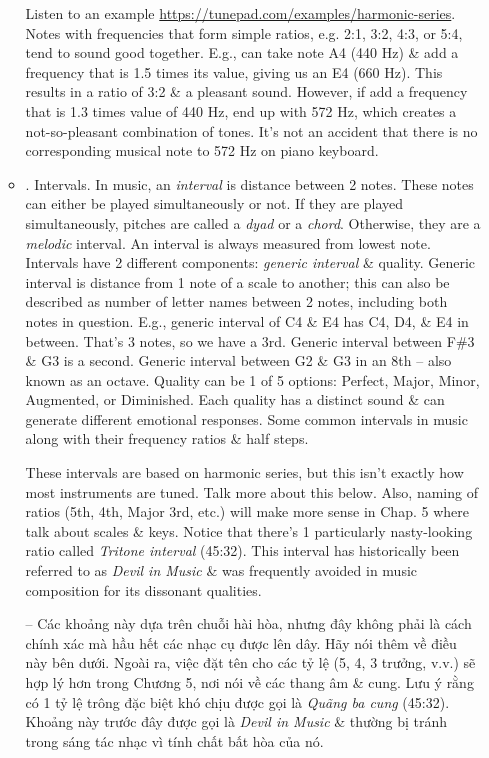 \documentclass{article}
\begin{document}
\begin{itemize}
\begin{itemize}
		Listen to an example \url{https://tunepad.com/examples/harmonic-series}. Notes with frequencies that form simple ratios, e.g. 2:1, 3:2, 4:3, or 5:4, tend to sound good together. E.g., can take note A4 (440 Hz) \& add a frequency that is 1.5 times its value, giving us an E4 (660 Hz). This results in a ratio of 3:2 \& a pleasant sound. However, if add a frequency that is 1.3 times value of 440 Hz, end up with 572 Hz, which creates a not-so-pleasant combination of tones. It's not an accident that there is no corresponding musical note to 572 Hz on piano keyboard.
		\item {. Intervals.} In music, an {\it interval} is distance between 2 notes. These notes can either be played simultaneously or not. If they are played simultaneously, pitches are called a {\it dyad} or a {\it chord}. Otherwise, they are a {\it melodic} interval. An interval is always measured from lowest note. Intervals have 2 different components: {\it generic interval} \& quality. Generic interval is distance from 1 note of a scale to another; this can also be described as number of letter names between 2 notes, including both notes in question. E.g., generic interval of C4 \& E4 has C4, D4, \& E4 in between. That's 3 notes, so we have a 3rd. Generic interval between F\#3 \& G3 is a second. Generic interval between G2 \& G3 in an 8th -- also known as an octave. Quality can be 1 of 5 options: Perfect, Major, Minor, Augmented, or Diminished. Each quality has a distinct sound \& can generate different emotional responses. Some common intervals in music along with their frequency ratios \& half steps. {\sf[Table]}
		
		These intervals are based on harmonic series, but this isn't exactly how most instruments are tuned. Talk more about this below. Also, naming of ratios (5th, 4th, Major 3rd, etc.) will make more sense in Chap. 5 where talk about scales \& keys. Notice that there's 1 particularly nasty-looking ratio called {\it Tritone interval} (45:32). This interval has historically been referred to as {\it Devil in Music} \& was frequently avoided in music composition for its dissonant qualities.
		
		-- Các khoảng này dựa trên chuỗi hài hòa, nhưng đây không phải là cách chính xác mà hầu hết các nhạc cụ được lên dây. Hãy nói thêm về điều này bên dưới. Ngoài ra, việc đặt tên cho các tỷ lệ (5, 4, 3 trưởng, v.v.) sẽ hợp lý hơn trong Chương 5, nơi nói về các thang âm \& cung. Lưu ý rằng có 1 tỷ lệ trông đặc biệt khó chịu được gọi là {\it Quãng ba cung} (45:32). Khoảng này trước đây được gọi là {\it Devil in Music} \& thường bị tránh trong sáng tác nhạc vì tính chất bất hòa của nó.
		

\end{itemize}
\end{itemize}
\end{document}
